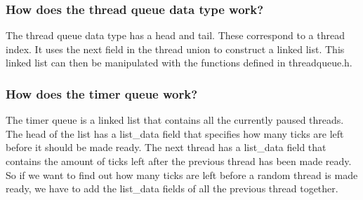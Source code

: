 \subsubsection*{How does the thread queue data type work?}
The thread queue data type has a head and tail. These correspond to a thread index. It uses the next field in the thread union to construct a linked list. This linked list can then be manipulated with the functions defined in threadqueue.h.\\
\subsubsection*{How does the timer queue work?}
The timer queue is a linked list that contains all the currently paused threads. The head of the list has a list\_{}data field that specifies how many ticks are left before it should be made ready. The next thread has a list\_{}data field that contains the amount of ticks left after the previous thread has been made ready. So if we want to find out how many ticks are left before a random thread is made ready, we have to add the list\_{}data fields of all the previous thread together.\\